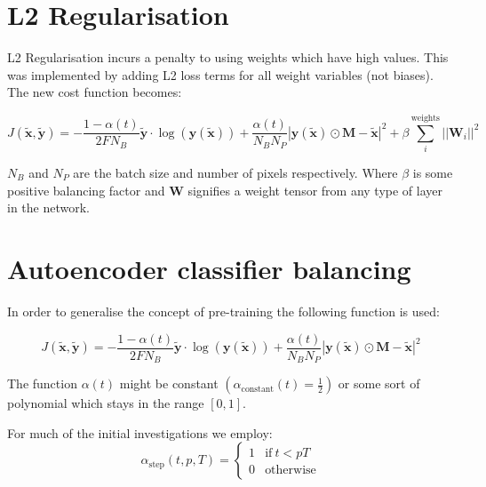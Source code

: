   \section{L2 Regularisation} \label{sec:modl2}
    L2 Regularisation incurs a penalty to using weights which have high values.
    This was implemented by adding L2 loss terms for all weight variables (not biases). The
    new cost function becomes:

    \begin{equation} \label{eq:l2_cost_model2}
        J(\tilde{\mathbf{x}},\tilde{\mathbf{y}}) = -\frac{1-\alpha(t)}{2FN_B}\tilde{\mathbf{y}}\cdot\log(\mathbf{y}(\tilde{\mathbf{x}}))
        + \frac{\alpha(t)}{N_BN_P}\left |\mathbf{y}(\tilde{\mathbf{x}}) \odot \mathbf{M}-\tilde{\mathbf{x}}\right | ^2
        + \beta \sum_i^{\text{weights}}||\mathbf{W}_i||^2
    \end{equation}

    $N_B$ and $N_P$ are the batch size and number of pixels respectively.
    Where $\beta$ is some positive balancing factor and $\mathbf{W}$ signifies
    a weight tensor from any type of layer in the network.



  \section{Autoencoder classifier balancing}
    \label{sec:autoalpha}
    In order to generalise the concept of pre-training the following function is used:

    \begin{equation}
      J(\tilde{\mathbf{x}},\tilde{\mathbf{y}}) = -\frac{1-\alpha(t)}{2FN_B}\tilde{\mathbf{y}}\cdot\log(\mathbf{y}(\tilde{\mathbf{x}}))
      + \frac{\alpha(t)}{N_BN_P}\left |\mathbf{y}(\tilde{\mathbf{x}}) \odot \mathbf{M}-\tilde{\mathbf{x}}\right | ^2
    \end{equation}

    The function $\alpha(t)$ might be constant $\left ( \alpha_{\text{constant}}(t)=\frac{1}{2} \right )$ or
    some sort of polynomial which stays in the range $[0,1]$.

    For much of the initial investigations we employ:
    \begin{equation}
      \alpha_{\text{step}}(t,p,T) =
      \begin{cases}
        1           & \text{if}\ t<pT \\
        0           & \text{otherwise}
      \end{cases}
    \end{equation}

